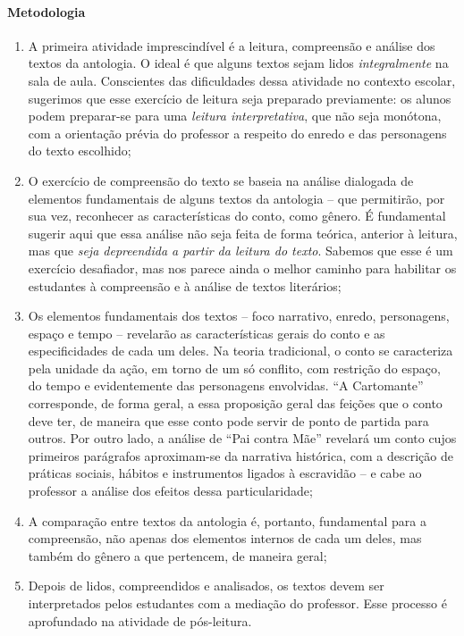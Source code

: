 \documentclass[12pt]{extarticle}
\begin{document}
\paragraph{Metodologia}
\begin{enumerate}
\item
A primeira atividade imprescindível é a leitura, compreensão e
análise dos textos da antologia. O ideal é que alguns textos sejam lidos
\emph{integralmente} na sala de aula. Conscientes das dificuldades dessa
atividade no contexto escolar, sugerimos que esse exercício de leitura
seja preparado previamente: os alunos podem preparar-se para uma
\emph{leitura interpretativa}, que não seja monótona, com a orientação
prévia do professor a respeito do enredo e das personagens do texto
escolhido;

\item
O exercício de compreensão do texto se baseia na análise dialogada de
elementos fundamentais de alguns textos da antologia -- que permitirão,
por sua vez, reconhecer as características do conto, como gênero. É
fundamental sugerir aqui que essa análise não seja feita de forma
teórica, anterior à leitura, mas que \emph{seja depreendida a partir da
leitura do texto}. Sabemos que esse é um exercício desafiador, mas nos
parece ainda o melhor caminho para habilitar os estudantes à compreensão
e à análise de textos literários;

\item
Os elementos fundamentais dos textos -- foco narrativo, enredo,
personagens, espaço e tempo -- revelarão as características gerais do
conto e as especificidades de cada um deles. Na teoria tradicional, o
conto se caracteriza pela unidade da ação, em torno de um só conflito,
com restrição do espaço, do tempo e evidentemente das personagens
envolvidas. ``A Cartomante'' corresponde, de forma geral, a essa
proposição geral das feições que o conto deve ter, de maneira que esse
conto pode servir de ponto de partida para outros. Por outro lado, a
análise de ``Pai contra Mãe'' revelará um conto cujos primeiros
parágrafos aproximam-se da narrativa histórica, com a descrição de
práticas sociais, hábitos e instrumentos ligados à escravidão -- e cabe
ao professor a análise dos efeitos dessa particularidade;

\item
A comparação entre textos da antologia é, portanto, fundamental para
a compreensão, não apenas dos elementos internos de cada um deles, mas
também do gênero a que pertencem, de maneira geral;

\item
Depois de lidos, compreendidos e analisados, os textos devem ser
interpretados pelos estudantes com a mediação do professor. Esse
processo é aprofundado na atividade de pós-leitura.
\end{enumerate}
\end{document}
